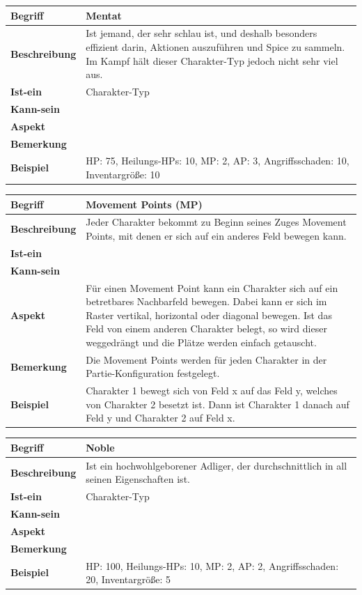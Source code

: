 \documentclass[12pt]{article}
\newcounter{fa}
\newcounter{nfa}
\begin{document}
\begin{tabularx}{16cm}{|l|X|}
\hline
\textbf{Begriff} & \textbf{Mentat} \\
\hline
\textbf{Beschreibung} & Ist jemand, der sehr schlau ist, und deshalb besonders effizient darin, Aktionen auszuführen und Spice zu sammeln. Im Kampf hält dieser Charakter-Typ jedoch nicht sehr viel aus. \\
\hline
\textbf{Ist-ein} & Charakter-Typ\\
\hline
\textbf{Kann-sein} & \\
\hline
\textbf{Aspekt} & \\
\hline
\textbf{Bemerkung} &  \\
\hline
\textbf{Beispiel} & HP: 75, Heilungs-HPs: 10, MP: 2, AP: 3, Angriffsschaden: 10, Inventargröße: 10 \\
\hline
\end{tabularx}

\begin{tabularx}{16cm}{|l|X|}
\hline
\textbf{Begriff} & \textbf{Movement Points (MP)} \\
\hline
\textbf{Beschreibung} & Jeder Charakter bekommt zu Beginn seines Zuges Movement Points, mit denen er sich auf ein anderes Feld bewegen kann. \\
\hline
\textbf{Ist-ein} & \\
\hline
\textbf{Kann-sein} & \\
\hline
\textbf{Aspekt} & Für einen Movement Point kann ein Charakter sich auf ein betretbares Nachbarfeld bewegen. Dabei kann er sich im Raster vertikal, horizontal oder diagonal bewegen. Ist das Feld von einem anderen Charakter belegt, so wird dieser weggedrängt und die Plätze werden einfach getauscht.\\
\hline
\textbf{Bemerkung} & Die Movement Points werden für jeden Charakter in der Partie-Konfiguration festgelegt. \\
\hline
\textbf{Beispiel} & Charakter 1 bewegt sich von Feld x auf das Feld y, welches von Charakter 2 besetzt ist. Dann ist Charakter 1 danach auf Feld y und Charakter 2 auf Feld x. \\
\hline
\end{tabularx}

\begin{tabularx}{16cm}{|l|X|}
\hline
\textbf{Begriff} & \textbf{Noble} \\
\hline
\textbf{Beschreibung} & Ist ein hochwohlgeborener Adliger, der durchschnittlich in all seinen Eigenschaften ist.\\
\hline
\textbf{Ist-ein} & Charakter-Typ\\
\hline
\textbf{Kann-sein} & \\
\hline
\textbf{Aspekt} & \\
\hline
\textbf{Bemerkung} &  \\
\hline
\textbf{Beispiel} & HP: 100, Heilungs-HPs: 10, MP: 2, AP: 2, Angriffsschaden: 20, Inventargröße: 5 \\
\hline
\end{tabularx}
\end{document}
